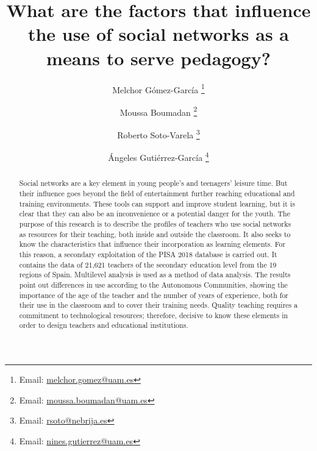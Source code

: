 \documentclass{textolivre}
\title{What are the factors that influence the use of social networks as a means to serve pedagogy?}
\author[1]{Melchor Gómez-García \orcid{0000-0003-3453-218X} \thanks{Email: \url{melchor.gomez@uam.es}}}
\author[1]{Moussa Boumadan \orcid{0000-0003-3334-1007} \thanks{Email: \url{moussa.boumadan@uam.es}}}
\author[2]{Roberto Soto-Varela \orcid{0000-0003-2105-5580} \thanks{Email: \url{rsoto@nebrija.es}}}
\author[1]{Ángeles Gutiérrez-García \orcid{0000-0001-7376-6064} \thanks{Email: \url{nines.gutierrez@uam.es}}}
\affil[1]{Universidad Autónoma de Madrid, Madrid, España.}
\affil[2]{Nebrija University, Madrid, España.}
\begin{document}
\maketitle

\begin{polyabstract}
\begin{english}
\begin{abstract}
Social networks are a key element in young people's and teenagers' leisure time. But their influence goes beyond the field of entertainment further reaching educational and training environments. These tools can support and improve student learning, but it is clear that they can also be an inconvenience or a potential danger for the youth. The purpose of this research is to describe the profiles of teachers who use social networks as resources for their teaching, both inside and outside the classroom. It also seeks to know the characteristics that influence their incorporation as learning elements. For this reason, a secondary exploitation of the PISA 2018 database is carried out. It contains the data of 21,621 teachers of the secondary education level from the 19 regions of Spain. Multilevel analysis is used as a method of data analysis. The results point out differences in use according to the Autonomous Communities, showing the importance of the age of the teacher and the number of years of experience, both for their use in the classroom and to cover their training needs. Quality teaching requires a commitment to technological resources; therefore, decisive to know these elements in order to design teachers and educational institutions.

\end{abstract}
\end{english}


\end{polyabstract}
\end{document}
